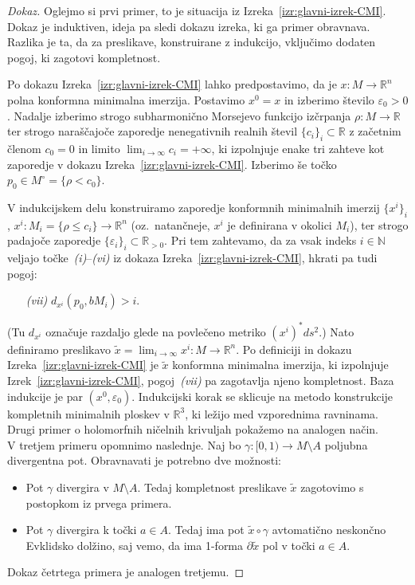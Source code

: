 \documentclass[12pt,a4paper,twoside]{article}
\theoremstyle{definition} %
\newenvironment{dokaz}[1][Dokaz]{\begin{proof}[#1]}{\end{proof}}
\theoremstyle{plain} %
\numberwithin{equation}{section}  %
\newcommand{\R}{\mathbb R}
\newcommand{\N}{\mathbb N}
\begin{document}
\begin{dokaz}
Oglejmo si prvi primer, to je situacija iz Izreka~\ref{izr:glavni-izrek-CMI}. 
Dokaz je induktiven, ideja pa sledi dokazu izreka, ki ga primer obravnava. Razlika je ta, da za preslikave, konstruirane z indukcijo, vključimo dodaten pogoj, ki zagotovi kompletnost.

Po dokazu Izreka~\ref{izr:glavni-izrek-CMI} lahko predpostavimo, da je $x \colon M \to \R^{n}$ polna konformna minimalna imerzija. 
Postavimo $x^0 = x$ in izberimo število $\varepsilon_{0}>0$. 
Nadalje izberimo strogo subharmonično Morsejevo funkcijo izčrpanja $\rho \colon M \to \R$ ter strogo naraščajoče zaporedje nenegativnih realnih števil $\{ c_{i} \}_{i} \subset \R$ z začetnim členom $c_0 = 0$ in limito $\lim_{i \to \infty}c_{i} = +\infty$, ki izpolnjuje enake tri zahteve kot zaporedje v dokazu Izreka~\ref{izr:glavni-izrek-CMI}.
Izberimo še točko $p_0 \in M^{\circ} = \{ \rho < c_0 \}$.

V indukcijskem delu konstruiramo zaporedje konformnih minimalnih imerzij $\{ x^{i} \}_{i}$, $x^{i}\colon M_{i} = \{ \rho \leq c_{i} \} \to \R^{n}$ (oz.~natančneje, $x^{i}$ je definirana v okolici $M_{i}$), ter strogo padajoče zaporedje $\{ \varepsilon_{i} \}_{i} \subset \R_{>0}$.
Pri tem zahtevamo, da za vsak indeks $i \in \N$ veljajo točke~\textit{(i)}--\textit{(vi)} iz dokaza Izreka~\ref{izr:glavni-izrek-CMI}, hkrati pa tudi pogoj:
\begin{itemize}
\item[\textit{(vii)}] $d_{x^{i}}(p_0, bM_{i}) > i$.
\end{itemize}
(Tu $d_{x^{i}}$ označuje razdaljo glede na povlečeno metriko $(x^{i})^{*}ds^2$.) \newline
Nato definiramo preslikavo $\tilde{x} = \lim_{i \to \infty}x^{i} \colon M \to \R^{n}$. Po definiciji in dokazu Izreka~\ref{izr:glavni-izrek-CMI} je $\tilde{x}$ konformna minimalna imerzija, ki izpolnjuje Izrek~\ref{izr:glavni-izrek-CMI}, pogoj~\textit{(vii)} pa zagotavlja njeno kompletnost. \newline
Baza indukcije je par $(x^{0}, \varepsilon_{0})$.
Indukcijski korak se sklicuje na metodo konstrukcije kompletnih minimalnih ploskev v $\R^3$, ki ležijo med vzporednima ravninama. \\[0.3cm]
%
Drugi primer o holomorfnih ničelnih krivuljah pokažemo na analogen način. \\[0.3cm]
%
V tretjem primeru opomnimo naslednje. Naj bo $\gamma \colon [0,1) \to M \setminus A$ poljubna divergentna pot. Obravnavati je potrebno dve možnosti:
\begin{itemize}
\item Pot $\gamma$ divergira v $M \setminus A$. Tedaj kompletnost preslikave $\tilde{x}$ zagotovimo s postopkom iz prvega primera.
\item Pot $\gamma$ divergira k točki $a \in A$. Tedaj ima pot $\tilde{x} \circ \gamma$ avtomatično neskončno Evklidsko dolžino, saj vemo, da ima 1-forma
	$\partial \tilde{x}$ pol v točki $a \in A$.
\end{itemize}
Dokaz četrtega primera je analogen tretjemu.
\end{dokaz}
\end{document}
